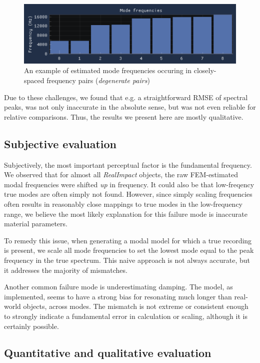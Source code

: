 \documentclass[12pt]{article}
\begin{document}
\begin{figure}
  \centering
  \includegraphics[width=\linewidth]{images/DegenerateModePairs.png}
  \caption{An example of estimated mode frequencies occuring in closely-spaced frequency pairs (\textit{degenerate pairs})}
  \label{fig:DegenerateModePairs}
\end{figure}

Due to these challenges, we found that e.g. a straightforward RMSE of spectral peaks, was not only inaccurate in the absolute sense, but was not even reliable for relative comparisons.
Thus, the results we present here are mostly qualitative.

\subsection{Subjective evaluation}

Subjectively, the most important perceptual factor is the fundamental frequency.
We observed that for almost all \textit{RealImpact} objects, the raw FEM-estimated modal frequencies were shifted \textit{up} in frequency.
It could also be that low-freqency true modes are often simply not found.
However, since simply scaling frequencies often results in reasonably close mappings to true modes in the low-frequency range, we believe the most likely explanation for this failure mode is inaccurate material parameters.

To remedy this issue, when generating a modal model for which a true recording is present, we scale all mode frequencies to set the lowest mode equal to the peak frequency in the true spectrum.
This naive approach is not always accurate, but it addresses the majority of mismatches.

Another common failure mode is underestimating damping.
The model, as implemented, seems to have a strong bias for resonating much longer than real-world objects, across modes.
The mismatch is not extreme or consistent enough to strongly indicate a fundamental error in calculation or scaling, although it is certainly possible.

\subsection{Quantitative and qualitative evaluation}
\end{document}
